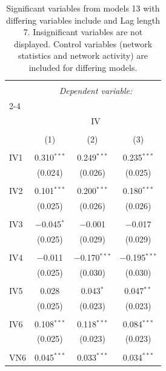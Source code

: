 
\begin{table}[!htbp] \centering 
  \caption{Significant variables from models 13 with differing variables include 
                               and Lag length 7. Insignificant variables are not displayed. 
                               Control variables (network statistics and network activity) are 
                               included for differing models.} 
  \label{IVmodels2_t} 
\scriptsize 
\begin{tabular}{@{\extracolsep{5pt}}lccc} 
\\[-1.8ex]\hline 
\hline \\[-1.8ex] 
 & \multicolumn{3}{c}{\textit{Dependent variable:}} \\ 
\cline{2-4} 
\\[-1.8ex] & \multicolumn{3}{c}{IV} \\ 
\\[-1.8ex] & (1) & (2) & (3)\\ 
\hline \\[-1.8ex] 
 IV1 & 0.310$^{***}$ & 0.249$^{***}$ & 0.235$^{***}$ \\ 
  & (0.024) & (0.026) & (0.025) \\ 
  & & & \\ 
 IV2 & 0.101$^{***}$ & 0.200$^{***}$ & 0.180$^{***}$ \\ 
  & (0.025) & (0.026) & (0.026) \\ 
  & & & \\ 
 IV3 & $-$0.045$^{*}$ & $-$0.001 & $-$0.017 \\ 
  & (0.025) & (0.029) & (0.029) \\ 
  & & & \\ 
 IV4 & $-$0.011 & $-$0.170$^{***}$ & $-$0.195$^{***}$ \\ 
  & (0.025) & (0.030) & (0.030) \\ 
  & & & \\ 
 IV5 & 0.028 & 0.043$^{*}$ & 0.047$^{**}$ \\ 
  & (0.025) & (0.023) & (0.023) \\ 
  & & & \\ 
 IV6 & 0.108$^{***}$ & 0.118$^{***}$ & 0.084$^{***}$ \\ 
  & (0.025) & (0.023) & (0.023) \\ 
  & & & \\ 
 VN6 & 0.045$^{***}$ & 0.033$^{***}$ & 0.034$^{***}$ \\ 

\end{tabular}
\end{table}
